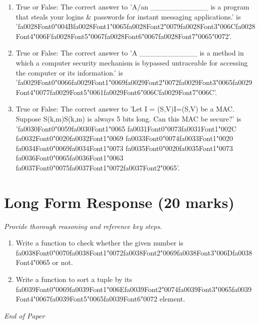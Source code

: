 \documentclass[12pt]{article}
\begin{document}
\begin{enumerate}[label=\arabic*.]
\item True or False: The correct answer to 'A/an \_\_\_\_\_\_\_\_\_\_\_ is a program that steals your logins \& passwords for instant messaging applications.' is '{\csname fa0028Font0\endcsname\char"004B}{\csname fa0028Font1\endcsname\char"0065}{\csname fa0028Font2\endcsname\char"0079}{\csname fa0028Font3\endcsname\char"006C}{\csname fa0028Font4\endcsname\char"006F}{\csname fa0028Font5\endcsname\char"0067}{\csname fa0028Font6\endcsname\char"0067}{\csname fa0028Font7\endcsname\char"0065}{\char"0072}'.
\item True or False: The correct answer to 'A \_\_\_\_\_\_\_\_\_\_\_ is a method in which a computer security mechanism is bypassed untraceable for accessing the computer or its information.' is '{\csname fa0029Font0\endcsname\char"0066}{\csname fa0029Font1\endcsname\char"0069}{\csname fa0029Font2\endcsname\char"0072}{\csname fa0029Font3\endcsname\char"0065}{\csname fa0029Font4\endcsname\char"0077}{\csname fa0029Font5\endcsname\char"0061}{\csname fa0029Font6\endcsname\char"006C}{\csname fa0029Font7\endcsname\char"006C}'.
\item True or False: The correct answer to 'Let I = (S,V)I=(S,V) be a MAC. Suppose S(k,m)S(k,m) is always 5 bits long. Can this MAC be secure?' is '{\csname fa0030Font0\endcsname\char"0059}{\csname fa0030Font1\endcsname\char"0065} {\csname fa0031Font0\endcsname\char"0073}{\csname fa0031Font1\endcsname\char"002C} {\csname fa0032Font0\endcsname\char"0020}{\csname fa0032Font1\endcsname\char"0069} {\csname fa0033Font0\endcsname\char"0074}{\csname fa0033Font1\endcsname\char"0020} {\csname fa0034Font0\endcsname\char"0069}{\csname fa0034Font1\endcsname\char"0073} {\csname fa0035Font0\endcsname\char"0020}{\csname fa0035Font1\endcsname\char"0073} {\csname fa0036Font0\endcsname\char"0065}{\csname fa0036Font1\endcsname\char"0063} {\csname fa0037Font0\endcsname\char"0075}{\csname fa0037Font1\endcsname\char"0072}{\csname fa0037Font2\endcsname\char"0065}'.
\end{enumerate}

\section*{Long Form Response (20 marks)}
\textit{Provide thorough reasoning and reference key steps.}
\begin{enumerate}[label=\arabic*.]
\item Write a function to check whether the given number is {\csname fa0038Font0\endcsname\char"0070}{\csname fa0038Font1\endcsname\char"0072}{\csname fa0038Font2\endcsname\char"0069}{\csname fa0038Font3\endcsname\char"006D}{\csname fa0038Font4\endcsname\char"0065} or not.
\item Write a function to sort a tuple by its {\csname fa0039Font0\endcsname\char"0069}{\csname fa0039Font1\endcsname\char"006E}{\csname fa0039Font2\endcsname\char"0074}{\csname fa0039Font3\endcsname\char"0065}{\csname fa0039Font4\endcsname\char"0067}{\csname fa0039Font5\endcsname\char"0065}{\csname fa0039Font6\endcsname\char"0072} element.
\end{enumerate}

\vfill
\noindent\textit{End of Paper}
\end{document}
